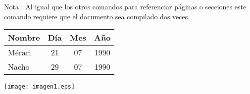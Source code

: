 \documentclass[a4paper,12pt]{article}
\begin{document}
Nota : Al igual que los otros comandos para referenciar páginas o secciones este comando requiere 
que el documento sea compilado dos veces. 

\bigskip
\begin{tabular}{|l|c|c|c|}
\hline
Nombre & Día & Mes & Año \\ \hline
Mérari & 21 & 07 & 1990 \\ \hline
Nacho & 29 & 07 & 1990 \\ \hline
\end{tabular}
\texttt{[image: imagen1.eps]}
\end{document}
